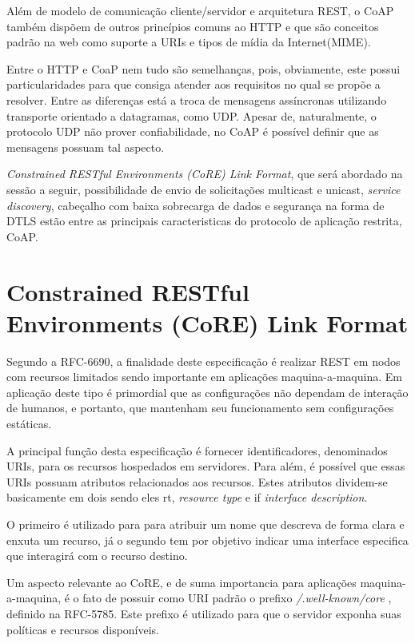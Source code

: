Além de modelo de comunicação cliente/servidor e arquitetura REST, o CoAP também dispõem de outros princípios comuns ao HTTP e que são conceitos padrão na web
como suporte a URIs\cite{rfc3986} e tipos de mídia da Internet(MIME)\cite{rfc2046}.

Entre o HTTP e CoaP nem tudo são semelhanças, pois, obviamente, este possui particularidades para que consiga atender aos requisitos no qual se propõe a resolver.
Entre as diferenças está a troca de mensagens assíncronas utilizando transporte orientado a datagramas, como UDP.
Apesar de, naturalmente, o protocolo UDP não prover confiabilidade, no CoAP é possível definir que as mensagens possuam tal aspecto.

\textit{Constrained RESTful Environments (CoRE) Link Format}, que será abordado na sessão a seguir, possibilidade de envio de solicitações multicast e unicast, \textit{service discovery}, cabeçalho com baixa sobrecarga de dados e segurança na forma de DTLS\cite{rfc6347}
estão entre as principais caracteristicas do protocolo de aplicação restrita, CoAP.



\section{Constrained RESTful Environments (CoRE) Link Format}

Segundo a RFC-6690, a finalidade deste especificação é realizar REST em nodos com recursos limitados sendo importante em aplicações maquina-a-maquina\cite{rfc6690}.
Em aplicação deste tipo é primordial que as configurações não dependam de interação de humanos, e portanto, que mantenham seu funcionamento sem configurações estáticas.


A principal função desta especificação é fornecer identificadores, denominados URIs, para os recursos hospedados em servidores. 
Para além, é possível que essas URIs possuam atributos relacionados aos recursos.
Estes atributos dividem-se basicamente em dois sendo eles rt, \textit{resource type} e if \textit{interface description}.

O primeiro é utilizado para para atribuir um nome que descreva de forma clara e enxuta um recurso,
já o segundo tem por objetivo indicar uma interface especifica que interagirá com o recurso destino.

Um aspecto relevante ao CoRE, e de suma importancia para aplicações maquina-a-maquina, é o fato de possuir como URI padrão o prefixo \textit{/.well-known/core} , definido na RFC-5785\cite{rfc5785}.
Este prefixo é utilizado para que o servidor exponha suas políticas e recursos disponíveis.

